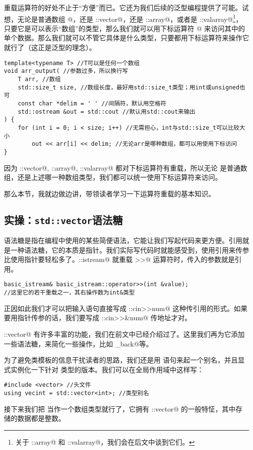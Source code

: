 重载运算符的好处不止于``方便''而已。它还为我们后续的泛型编程提供了可能。试想，无论是普通数组 \lstinline@T[N]@，还是 \lstinline@std::vector@，还是 \lstinline@std::array@，或者是 \lstinline@std::valarray@\footnote{关于 \lstinline@std::array@ 和 \lstinline@std::valarray@，我们会在后文中谈到它们。}，只要它是可以表示``数组''的类型，那么我们就可以用下标运算符 \lstinline@[]@ 来访问其中的单个数据。那么我们就可以不管它具体是什么类型，只要都用下标运算符来操作它就行了（这正是泛型的理念）。
\begin{lstlisting}
template<typename T> //T可以是任何一个数组
void arr_output( //参数过多，所以换行写
    T arr, //数组
    std::size_t size, //数组长度，最好用std::size_t类型；用int或unsigned也可
    const char *delim = ' ' //间隔符，默认用空格符
    std::ostream &out = std::cout //默认用std::cout来输出
) {
    for (int i = 0; i < size; i++) //无需担心，int与std::size_t可以比较大小
        out << arr[i] << delim; //无论arr是哪种数组，都可以用使用下标访问
}
\end{lstlisting}
因为 \lstinline@std::vector@, \lstinline@std::array@, \lstinline@std::valarray@ 都对下标运算符有重载，所以无论 \lstinline@arr@ 是普通数组，还是上述哪一种数组类型，我们都可以统一使用下标运算符来访问。\par
那么本节，我就边做边讲，带领读者学习一下运算符重载的基本知识。\par
\subsection*{实操：\texttt{std::vector}语法糖}
语法糖是指在编程中使用的某些简便语法，它能让我们写起代码来更方便。引用就是一种语法糖，它的本质是指针。我们实际写代码时就能感受到，使用引用来传参比使用指针要轻松多了。\lstinline@std::istream@ 就重载 \lstinline@>>@ 运算符时，传入的参数就是引用。
\begin{lstlisting}
basic_istream& basic_istream::operator>>(int &value);
//这里它的若干重载之一，其右操作数为int&类型
\end{lstlisting}
正因如此我们才可以把输入语句直接写成 \lstinline@std::cin>>num@ 这种传引用的形式。如果要用指针传参的话，我们要写成 \lstinline@std::cin>>&num@ 传地址才对。\par
\lstinline@std::vector@ 有许多丰富的功能，我们在前文中已经介绍过了。这里我们再为它添加一些语法糖，来简化一些操作，比如 \lstinline@push_back@等。\par
为了避免类模板的信息干扰读者的思路，我们还是用 \lstinline@using@ 语句来起一个别名，并且显式实例化一下针对 \lstinline@int@ 类型的版本。我们可以在全局作用域中这样写：
\begin{lstlisting}
#include <vector> //头文件
using vecint = std::vector<int>; //类型别名
\end{lstlisting}
接下来我们把 \lstinline@vecint@ 当作一个数组类型就行了，它拥有 \lstinline@std::vector@ 的一般特怔，其中存储的数据都是整数。\par
